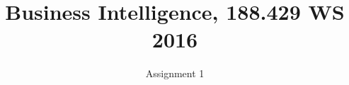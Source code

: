 \documentclass{sig-alternate-05-2015}
\begin{document}







%

\title{Business Intelligence, 188.429 WS 2016}
\subtitle{Assignment 1}
%
%
%
%
%
\end{document}
